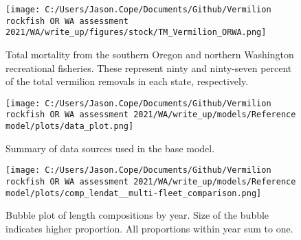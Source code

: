 \documentclass[11pt,
  english,
  a4paper,
]{article}
\begin{document}
\tagmcend\tagstructend


\begin{figure}
\centering
\texttt{[image: C:/Users/Jason.Cope/Documents/Github/Vermilion rockfish OR WA assessment 2021/WA/write\_up/figures/stock/TM\_Vermilion\_ORWA.png]}
\caption{Total mortality from the southern Oregon and northern Washington recreational fisheries. These represent ninty and ninty-seven percent of the total vermilion removals in each state, respectively.\label{fig:tm-plot}}
\end{figure}

\tagmcend\tagstructend


\begin{figure}
\centering
\texttt{[image: C:/Users/Jason.Cope/Documents/Github/Vermilion rockfish OR WA assessment 2021/WA/write\_up/models/Reference model/plots/data\_plot.png]}
\caption{Summary of data sources used in the base model.\label{fig:data-plot}}
\end{figure}

\tagmcend\tagstructend


\begin{figure}
\centering
\texttt{[image: C:/Users/Jason.Cope/Documents/Github/Vermilion rockfish OR WA assessment 2021/WA/write\_up/models/Reference model/plots/comp\_lendat\_\_multi-fleet\_comparison.png]}
\caption{Bubble plot of length compositions by year. Size of the bubble indicates higher proportion. All proportions within year sum to one.\label{fig:rec-lts_bubbs}}
\end{figure}

\tagmcend\tagstructend

\end{document}
